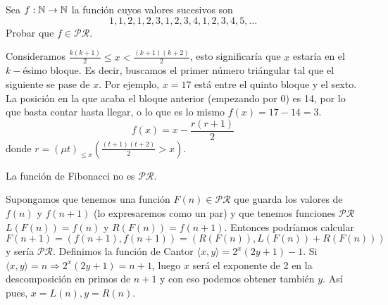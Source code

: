 \documentclass[twoside]{article}
\begin{document}
\newpage

\begin{ejercicio}{9}
Sea $f : \mathbb{N} \to \mathbb{N}$ la función cuyos valores sucesivos son
$$1, 1, 2, 1, 2, 3, 1, 2, 3, 4, 1, 2, 3, 4, 5, \dots$$
Probar que $f \in \mathcal{PR}$.
\end{ejercicio}
\begin{solucion}
Consideramos $\frac{k(k+1)}{2}\leq x < \frac{(k+1)(k+2)}{2}$, esto significaría que $x$ estaría en el $k-$ésimo bloque. Es decir, buscamos el primer número triángular tal que el siguiente se pase de $x$. Por ejemplo, $x=17$ está entre el quinto bloque y el sexto. La posición en la que acaba el bloque anterior (empezando por 0) es 14, por lo que basta contar hasta llegar, o lo que es lo mismo $f(x)=17-14=3$.
$$f(x)=x-\frac{r(r+1)}{2}$$
donde $r=(\mu t)_{\leq x}\left(\frac{(t+1)(t+2)}{2}>x\right)$. 
\end{solucion}

\newpage

\begin{ejercicio}{}
La función de Fibonacci no es $\mathcal{PR}$.
\end{ejercicio}
\begin{solucion}
Supongamos que tenemos una función $F(n)\in\mathcal{PR}$ que guarda los valores de $f(n)$ y $f(n+1)$ (lo expresaremos como un par) y que tenemos funciones $\mathcal{PR}$ $L(F(n))=f(n)$ y $R(F(n))=f(n+1)$. Entonces podríamos calcular $F(n+1)=(f(n+1),f(n+1))=(R(F(n)), L(F(n))+R(F(n)))$ y sería $\mathcal{PR}$. Definimos la función de Cantor $\langle x,y\rangle =2^x(2y+1)-1$. Si $\langle x,y\rangle =n\Rightarrow 2^x(2y+1)=n+1$, luego $x$ será el exponente de 2 en la descomposición en primos de $n+1$ y con eso podemos obtener también $y$. Así pues, $x=L(n), y=R(n)$. 
\end{solucion}
\end{document}
